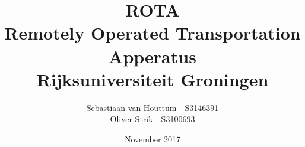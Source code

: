 \documentclass[11pt, a4paper]{article}
\begin{document}
\begin{titlepage}
  \centering
  \title{ROTA \\\large Remotely Operated Transportation Apperatus \\\small \textbf{Rijksuniversiteit Groningen}}
  \author{Sebastiaan van Houttum - S3146391 \\ Oliver Strik - S3100693}
  \date{November 2017}
  \maketitle
  \thispagestyle{empty}
\end{titlepage}

\pagebreak\tableofcontents\pagebreak







\end{document}
